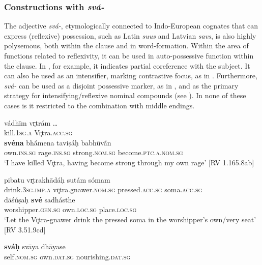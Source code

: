 \documentclass[output=paper]{langscibook}
\begin{document}
\subsubsection{Constructions with \textit{svá-}}
\label{sec:Orqueda:2.3.1}


The adjective \textit{svá-}, etymologically connected to Indo-European cognates that can express (reflexive) possession, such as Latin \textit{suus} and Latvian \textit{savs}, is also highly polysemous, both within the clause and in word-formation. Within the area of functions related to reflexivity, it can be used in {auto-possessive} function within the clause. In , for example, it indicates partial coreference with the subject. It can also be used as an {intensifier}, marking contrastive focus, as in . Furthermore, \textit{svá-} can be used as a {disjoint} {possessive} {marker}, as in , and as the primary strategy for intensifying/reflexive {nominal} {compounds} (see ). In none of these cases is it restricted to the combination with middle endings.%

\ea%
    \label{ex:Orqueda:23}
\gll vádhīm   vr̥trám …\\
  kill.\textsc{1sg.a}  Vr̥tra.\textsc{acc.sg}\\

\gll   \textbf{svéna} bh\'{ā}mena  taviṣáḥ  babhūv\'{ā}n\\
  own.\textsc{ins.sg}  rage.\textsc{ins.sg}  strong.\textsc{nom.sg}  become.\textsc{ptc.a.nom.sg}\\
\glt ‘I have killed Vr̥tra, having become strong through my own rage’ [RV 1.165.8ab]
\z

\ea%
    \label{ex:Orqueda:24}
\ea
 \label{ex:Orqueda:24a}
\gll pibatu  vr̥trakhādáḥ  sutám  sómam\\
    drink.\textsc{3sg.imp.a}  vr̥tra.gnawer.\textsc{nom.sg}  pressed.\textsc{acc.sg}  soma.\textsc{acc.sg}\\

\gll    dāśúṣaḥ \textbf{své} sadhásthe\\
    worshipper.\textsc{gen.sg}  own.\textsc{loc.sg}  place.\textsc{loc.sg}\\
\glt    ‘Let the Vr̥tra-gnawer drink the pressed soma in the worshipper’s own/very seat’  [RV 3.51.9cd]

\ex
 \label{ex:Orqueda:24b}
\gll \textbf{sváḥ} svāya  dhāyase\\
      self.\textsc{nom.sg}  own.\textsc{dat.sg}  nourishing.\textsc{dat.sg}\\
\end{document}
